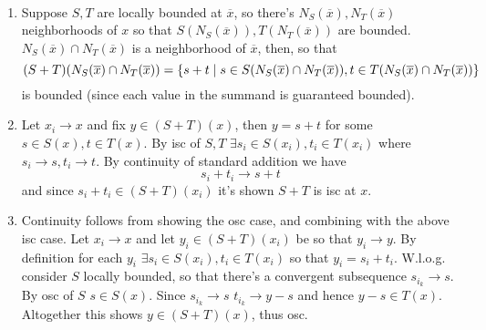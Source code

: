\documentclass{article}
\newenvironment{ex}[1]
  {\renewcommand\theexercise{#1}\exercise}
  {\endexercise}
\begin{document}
\begin{ex}{2.25} \, \\
  \newcommand{\xb}{\overline{x}}
  \begin{enumerate}[label=(\alph*)]
    \item Suppose $S, T$ are locally bounded at $\xb$, so there's $N_S(\xb), N_T(\xb)$ neighborhoods of $x$ so that $S(N_S(\xb)), T(N_T(\xb))$ are bounded. $N_S(\xb) \cap N_T(\xb)$ is a neighborhood of $\xb$, then, so that
      $$
      (S + T)(N_S(\xb) \cap N_T(\xb)) = \braces{ s + t \mid s \in S(N_S(\xb) \cap N_T(\xb)), t \in T(N_S(\xb) \cap N_T(\xb)) }
      $$
      is bounded (since each value in the summand is guaranteed bounded).
    \item
      Let $x_i \to x$ and fix $y \in (S + T)(x)$, then $y = s + t$ for some $s \in S(x), t \in T(x)$. By isc of $S, T$ $\exists s_i \in S(x_i), t_i \in T(x_i)$ where $s_i \to s, t_i \to t$. By continuity of standard addition we have
      $$
      s_i + t_i \to s + t
      $$
      and since $s_i + t_i \in (S + T)(x_i)$ it's shown $S+T$ is isc at $x$.
    \item
      Continuity follows from showing the osc case, and combining with the above isc case. Let $x_i \to x$ and let $y_i \in (S + T)(x_i)$ be so that $y_i \to y$. By definition for each $y_i$ $\exists s_i \in S(x_i), t_i \in T(x_i)$ so that $y_i = s_i + t_i$. W.l.o.g. consider $S$ locally bounded, so that there's a convergent subsequence $s_{i_k} \to s$. By osc of $S$ $s \in S(x)$. Since $s_{i_k} \to s$ $t_{i_k} \to y - s$ and hence $y - s \in T(x)$. Altogether this shows $y \in (S+T)(x)$, thus osc.
  \end{enumerate}
\end{ex}
\end{document}

